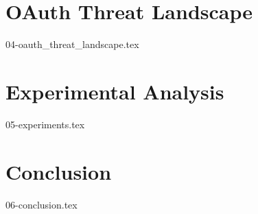 \documentclass[
    fontsize=12pt,
    headings=small,
    parskip=half,           %
    bibliography=totoc,
    numbers=noenddot,       %
    open=any,               %
	final                   %
    ]{scrreprt}
\begin{document}
\chapter{OAuth Threat Landscape}
\label{chap:oauth_security}
{04-oauth_threat_landscape.tex}

\chapter{Experimental Analysis}
\label{chap:experimental_analysis}
{05-experiments.tex}

\chapter{Conclusion}
\label{chap:conclusion}
{06-conclusion.tex}


\begin{raggedright}         %
  \printbibliography        %
  \label{sec:literaturverzeichnis}
\end{raggedright}


		

\end{document}
